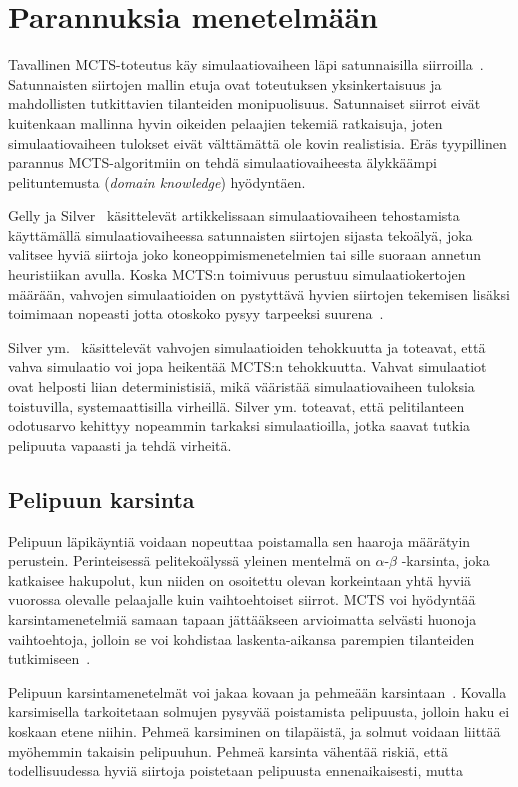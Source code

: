 \documentclass[12pt,finnish]{tktltiki2}
\theoremstyle{definition}
\theoremstyle{remark}
\begin{document}
\section{Parannuksia menetelmään}

Tavallinen MCTS-toteutus käy simulaatiovaiheen läpi satunnaisilla siirroilla~\cite{browne}. Satunnaisten siirtojen mallin etuja ovat toteutuksen yksinkertaisuus ja mahdollisten tutkittavien tilanteiden monipuolisuus. Satunnaiset siirrot eivät kuitenkaan mallinna hyvin oikeiden pelaajien tekemiä ratkaisuja, joten simulaatiovaiheen tulokset eivät välttämättä ole kovin realistisia. Eräs tyypillinen parannus MCTS-algoritmiin on tehdä simulaatiovaiheesta älykkäämpi pelituntemusta (\textit{domain knowledge}) hyödyntäen.

Gelly ja Silver~\cite{gellysilver} käsittelevät artikkelissaan simulaatiovaiheen tehostamista käyttämällä simulaatiovaiheessa satunnaisten siirtojen sijasta tekoälyä, joka valitsee hyviä siirtoja joko koneoppimismenetelmien tai sille suoraan annetun heuristiikan avulla. Koska MCTS:n toimivuus perustuu simulaatiokertojen määrään, vahvojen simulaatioiden on pystyttävä hyvien siirtojen tekemisen lisäksi toimimaan nopeasti jotta otoskoko pysyy tarpeeksi suurena~\cite{browne}.

Silver ym.~\cite{silver} käsittelevät vahvojen simulaatioiden tehokkuutta ja toteavat, että vahva simulaatio voi jopa heikentää MCTS:n tehokkuutta. Vahvat simulaatiot ovat helposti liian deterministisiä, mikä vääristää simulaatiovaiheen tuloksia toistuvilla, systemaattisilla virheillä. Silver ym. toteavat, että pelitilanteen odotusarvo kehittyy nopeammin tarkaksi simulaatioilla, jotka saavat tutkia pelipuuta vapaasti ja tehdä virheitä.


\subsection{Pelipuun karsinta}

Pelipuun läpikäyntiä voidaan nopeuttaa poistamalla sen haaroja määrätyin perustein. Perinteisessä pelitekoälyssä yleinen mentelmä on $\alpha$-$\beta$ -karsinta, joka katkaisee hakupolut, kun niiden on osoitettu olevan korkeintaan yhtä hyviä vuorossa olevalle pelaajalle kuin vaihtoehtoiset siirrot. MCTS voi hyödyntää karsintamenetelmiä samaan tapaan jättääkseen arvioimatta selvästi huonoja vaihtoehtoja, jolloin se voi kohdistaa laskenta-aikansa parempien tilanteiden tutkimiseen~\cite{browne}.

Pelipuun karsintamenetelmät voi jakaa kovaan ja pehmeään karsintaan~\cite{browne}. Kovalla karsimisella tarkoitetaan solmujen pysyvää poistamista pelipuusta, jolloin haku ei koskaan etene niihin. Pehmeä karsiminen on tilapäistä, ja solmut voidaan liittää myöhemmin takaisin pelipuuhun. Pehmeä karsinta vähentää riskiä, että todellisuudessa hyviä siirtoja poistetaan pelipuusta ennenaikaisesti, mutta 
\end{document}
